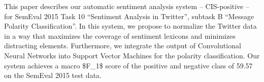 This paper describes our automatic sentiment analysis system -- CIS-positive -- for SemEval 2015 Task 10 ``Sentiment Analysis in Twitter'', subtask B ``Message Polarity Classification''. In this system, we propose to normalize the Twitter data in a way that maximizes the coverage of sentiment lexicons and minimizes distracting elements. Furthermore, we integrate the output of Convolutional Neural Networks into Support Vector Machines for the polarity classification. Our system achieves a macro \$F\_1\$ score of the positive and negative class of 59.57 on the SemEval 2015 test data.
